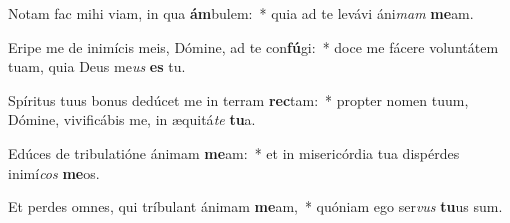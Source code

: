 \item Notam fac mihi viam, in qua \textbf{ám}bulem:~* quia ad te levávi áni\textit{mam} \textbf{me}am.
\item Eripe me de inimícis meis, Dómine, ad te con\textbf{fú}gi:~* doce me fácere voluntátem tuam, quia Deus me\textit{us} \textbf{es} tu.
\item Spíritus tuus bonus dedúcet me in terram \textbf{rec}tam:~* propter nomen tuum, Dómine, vivificábis me, in æquitá\textit{te} \textbf{tu}a.
\item Edúces de tribulatióne ánimam \textbf{me}am:~* et in misericórdia tua dispérdes inimí\textit{cos} \textbf{me}os.
\item Et perdes omnes, qui tríbulant ánimam \textbf{me}am,~* quóniam ego ser\textit{vus} \textbf{tu}us sum.
